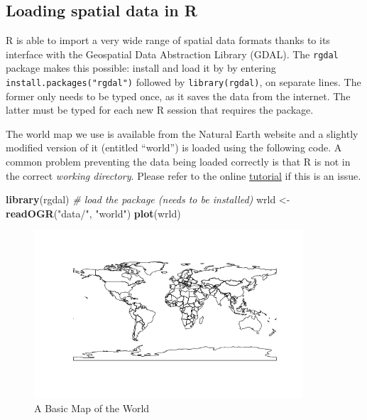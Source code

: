 \documentclass[]{article}
\newenvironment{Shaded}{}{}
\newcommand{\KeywordTok}[1]{\textcolor[rgb]{0.00,0.44,0.13}{\textbf{{#1}}}}
\newcommand{\StringTok}[1]{\textcolor[rgb]{0.25,0.44,0.63}{{#1}}}
\newcommand{\CommentTok}[1]{\textcolor[rgb]{0.38,0.63,0.69}{\textit{{#1}}}}
\newcommand{\NormalTok}[1]{{#1}}
\let\Oldincludegraphics\includegraphics
\renewcommand{\includegraphics}[1]{\Oldincludegraphics[width=10cm]{#1}}
\begin{document}
\subsection{Loading spatial data in R}

R is able to import a very wide range of spatial data formats thanks to
its interface with the Geospatial Data Abstraction Library (GDAL). The
\texttt{rgdal} package makes this possible: install and load it by by
entering \texttt{install.packages("rgdal")} followed by
\texttt{library(rgdal)}, on separate lines. The former only needs to be
typed once, as it saves the data from the internet. The latter must be
typed for each new R session that requires the package.

The world map we use is available from the Natural Earth website and a
slightly modified version of it (entitled ``world'') is loaded using the
following code. A common problem preventing the data being loaded
correctly is that R is not in the correct \emph{working directory}.
Please refer to the online
\href{https://github.com/geocomPP/sdvwR/blob/master/sdv-tutorial.pdf?raw=true}{tutorial}
if this is an issue.

\begin{Shaded}
\begin{Highlighting}[]
\KeywordTok{library}\NormalTok{(rgdal)  }\CommentTok{# load the package (needs to be installed)}
\NormalTok{wrld <- }\KeywordTok{readOGR}\NormalTok{(}\StringTok{"data/"}\NormalTok{, }\StringTok{"world"}\NormalTok{)}
\KeywordTok{plot}\NormalTok{(wrld)}
\end{Highlighting}
\end{Shaded}

\begin{figure}[htbp]
\centering
\includegraphics{figure/A_Basic_Map_of_the_World.png}
\caption{A Basic Map of the World}
\end{figure}
\end{document}
